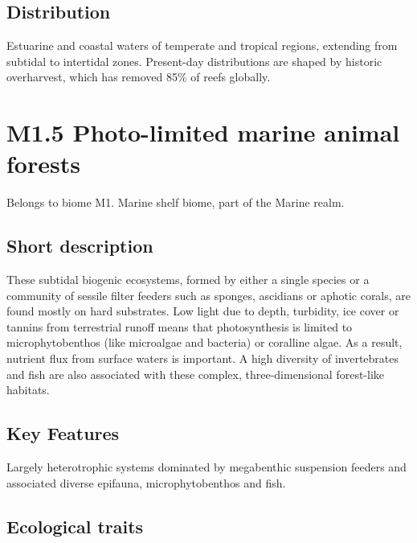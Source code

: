 \documentclass[
  letterpaper,
  DIV=11,
  numbers=noendperiod]{scrartcl}
\begin{document}
\subsection{Distribution}\label{distribution-29}

Estuarine and coastal waters of temperate and tropical regions,
extending from subtidal to intertidal zones. Present-day distributions
are shaped by historic overharvest, which has removed 85\% of reefs
globally.

\section{M1.5 Photo-limited marine animal
forests}\label{m1.5-photo-limited-marine-animal-forests}

Belongs to biome M1. Marine shelf biome, part of the Marine realm.

\subsection{Short description}\label{short-description-30}

These subtidal biogenic ecosystems, formed by either a single species or
a community of sessile filter feeders such as sponges, ascidians or
aphotic corals, are found mostly on hard substrates. Low light due to
depth, turbidity, ice cover or tannins from terrestrial runoff means
that photosynthesis is limited to microphytobenthos (like microalgae and
bacteria) or coralline algae. As a result, nutrient flux from surface
waters is important. A high diversity of invertebrates and fish are also
associated with these complex, three-dimensional forest-like habitats.

\subsection{Key Features}\label{key-features-30}

Largely heterotrophic systems dominated by megabenthic suspension
feeders and associated diverse epifauna, microphytobenthos and fish.

\subsection{Ecological traits}\label{ecological-traits-30}
\end{document}

